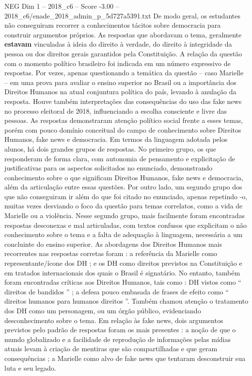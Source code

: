 \begin{textsample}{NEG Dim 1 – 2018\_c6 – Score -3.00 – 2018\_c6/enade\_2018\_admin\_p\_5d727a5391.txt}
De modo geral, os estudantes não conseguiram recorrer a conhecimentos tácitos sobre democracia para construir argumentos próprios.
As respostas que abordavam o tema, geralmente \textbf{estavam} vinculadas à ideia do direito à verdade, do direito à integridade da pessoa ou dos direitos gerais garantidos pela Constituição.
A relação da questão com o momento político brasileiro foi indicada em um número expressivo de respostas.
Por vezes, apenas questionando a temática da questão – caso Marielle – em uma prova para avaliar o ensino superior no Brasil ou a importância dos Direitos Humanos na atual conjuntura política do país, levando à anulação da resposta.
Houve também interpretações das consequências do uso das fake news no processo eleitoral de 2018, influenciando a escolha consciente e livre das pessoas.
As respostas demonstraram atenção político social frente a esses temas, porém com pouco domínio conceitual do campo de conhecimento sobre Direitos Humanos, fake news e democracia.
Em termos da linguagem adotada pelos alunos, há dois grandes grupos de respostas.
No primeiro grupo, os que responderam de forma clara, com autonomia de pensamento e explicitação de justificativas para os aspectos solicitados no enunciado, demonstrando conhecimento sobre o que significam Direitos Humanos, fake news e democracia, além da articulação entre essas questões.
Por outro lado, um segundo grupo dos que não conseguiram ir além do que foi citado no enunciado, apenas repetindo -o, muitas vezes desviando o foco da questão para temas correlatos, como a vida de Marielle ou a violência.
Nesse segundo grupo, mais facilmente foram encontradas respostas desconexas e mal articuladas, com textos confusos que explicitam o não conhecimento sobre o tema e a falta de adequação à linguagem, necessária a um concluinte do ensino superior.
As abordagens dos Direitos Humanos mais recorrentes nas respostas corretas foram : a referência da Marielle como representante/ícone dos DH ; e os DH como direitos previstos na Constituição e em tratados internacionais dos quais o Brasil é signatário.
No entanto, também foram encontradas críticas aos Direitos Humanos, tais como : DH vistos como “ direitos de bandidos ” ; a defesa pouco embasada de frases de efeito como “ direitos humanos para humanos direitos ”.
Também chamou atenção o tratamento dos DH como um personagem, ou um órgão público, evidenciando desconhecimento sobre o tema.
Em relação às fake news, dois argumentos previstos pelo padrão de respostas foram os mais presentes : a noção de que o mundo globalizado e a facilidade de reprodução de informações pelas mídias atuais levam à criação de mentiras que são compartilhadas e que geram consequências ; a Marielle como alvo de fake news que tentaram desconstruir sua luta e seu legado.

\end{textsample}
